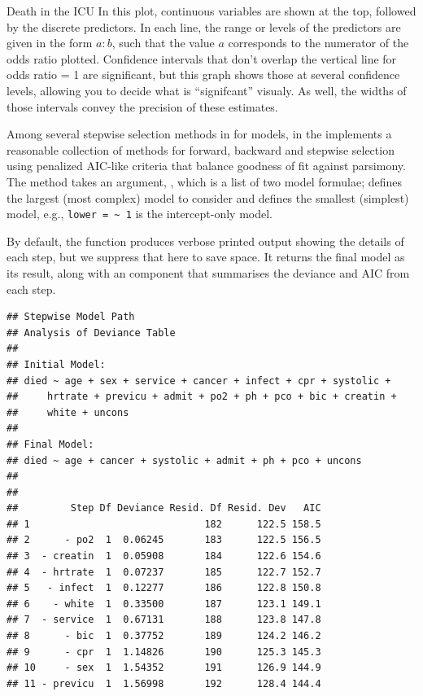 \documentclass[11pt]{book}
\renewenvironment{knitrout}{\small\renewcommand{\baselinestretch}{.85}}{} %
\begin{document}
\begin{Example}[icu1]{Death in the ICU}
In this plot, continuous variables are shown at the top, followed by the discrete predictors.
In each line, the range or levels of the predictors are given in the form $a:b$, such that
the value $a$ corresponds to the numerator of the odds ratio plotted.
Confidence intervals that don't overlap the vertical line for odds ratio = 1 are
significant, but this graph shows those at several confidence levels, allowing you to
decide what is ``signifcant'' visualy.  As well, the widths of those intervals
convey the precision of these estimates.

Among several stepwise selection methods in \R for  models,
 in the  implements a reasonable collection
of methods for forward, backward and stepwise selection using penalized
AIC-like criteria that balance goodness of fit against parsimony.
The method takes an argument, , which is a list of
two model formulae;  defines the largest (most complex)
model to consider and  defines the smallest (simplest)
model, e.g., \verb|lower = ~ 1| is the intercept-only model.

By default, the function produces verbose printed output showing the details
of each step, but we suppress that here to save space.  It returns the final
model as its result, along with an  component that summarises the
deviance and AIC from each step.
\begin{knitrout}
\color{fgcolor}\begin{kframe}
\begin{alltt}
 \hlkwb{<-}   \hlstd{=} \hlstd{)}
\hlopt{$}
\end{alltt}
\begin{verbatim}
## Stepwise Model Path 
## Analysis of Deviance Table
## 
## Initial Model:
## died ~ age + sex + service + cancer + infect + cpr + systolic + 
##     hrtrate + previcu + admit + po2 + ph + pco + bic + creatin + 
##     white + uncons
## 
## Final Model:
## died ~ age + cancer + systolic + admit + ph + pco + uncons
## 
## 
##         Step Df Deviance Resid. Df Resid. Dev   AIC
## 1                              182      122.5 158.5
## 2      - po2  1  0.06245       183      122.5 156.5
## 3  - creatin  1  0.05908       184      122.6 154.6
## 4  - hrtrate  1  0.07237       185      122.7 152.7
## 5   - infect  1  0.12277       186      122.8 150.8
## 6    - white  1  0.33500       187      123.1 149.1
## 7  - service  1  0.67131       188      123.8 147.8
## 8      - bic  1  0.37752       189      124.2 146.2
## 9      - cpr  1  1.14826       190      125.3 145.3
## 10     - sex  1  1.54352       191      126.9 144.9
## 11 - previcu  1  1.56998       192      128.4 144.4
\end{verbatim}
\end{kframe}
\end{knitrout}


\end{Example}
\end{document}

